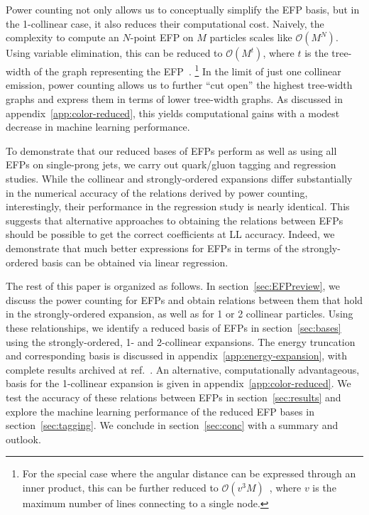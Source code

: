 \documentclass[a4paper,11pt]{article}
\renewcommand{\sec}[1]{section~\ref{sec:#1}}
\newcommand{\app}[1]{appendix~\ref{app:#1}}
\newcommand{\refcite}[1]{ref.~\cite{#1}}
\begin{document}
Power counting not only allows us to conceptually simplify the EFP basis, but in the 1-collinear case, it also reduces their computational cost.
%
Naively, the complexity to compute an $N$-point EFP on $M$ particles scales like $\mathcal{O}(M^N)$.
%
Using variable elimination, this can be reduced to $\mathcal{O}(M^t)$, where $t$ is the tree-width of the graph representing the EFP~\cite{Komiske:2017aww}.%
%
\footnote{For the special case where the angular distance can be expressed through an inner product, this can be further reduced to $\mathcal{O}(v^3 M)$~\cite{Komiske:2019asc}, where $v$ is the maximum number of lines connecting to a single node.}
%
In the limit of just one collinear emission, power counting allows us to further ``cut open'' the highest tree-width graphs and express them in terms of lower tree-width graphs.
%
As discussed in \app{color-reduced}, this yields computational gains with a modest decrease in machine learning performance.

 



To demonstrate that our reduced bases of EFPs perform as well as using all EFPs on single-prong jets, we carry out quark/gluon tagging and regression studies.
%
While the collinear and strongly-ordered expansions differ substantially in the numerical accuracy of the  relations derived by power counting, interestingly, their performance in the regression study is nearly identical.
%
This suggests that alternative approaches to obtaining the relations between EFPs should be possible to get the correct coefficients at LL accuracy.
%
Indeed, we demonstrate that much better expressions for EFPs in terms of the strongly-ordered basis can be obtained via linear regression.



The rest of this paper is organized as follows.
%
In \sec{EFPreview}, we discuss the power counting for EFPs and obtain relations between them that hold in the strongly-ordered expansion, as well as for 1 or 2 collinear particles.
%
Using these relationships, we identify a reduced basis of EFPs in \sec{bases} using the strongly-ordered, 1- and 2-collinear expansions.
%
The energy truncation and corresponding basis is discussed in \app{energy-expansion}, with complete results archived at \refcite{cal_pedro_2022_6542205}.
%
An alternative, computationally advantageous, basis for the 1-collinear expansion is given in \app{color-reduced}.
%
We test the accuracy of these relations between EFPs in \sec{results} and explore the machine learning performance of the reduced EFP bases in \sec{tagging}.
%
We conclude in \sec{conc} with a summary and outlook.
\end{document}
